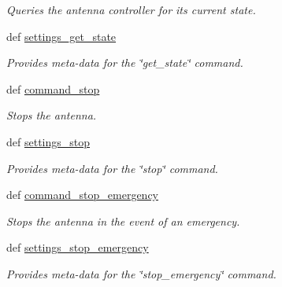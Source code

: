 \begin{DoxyCompactItemize}
\begin{DoxyCompactList}\small\item\em Queries the antenna controller for its current state. \end{DoxyCompactList}\item 
def \hyperlink{classhwm_1_1hardware_1_1devices_1_1drivers_1_1mxl__antenna__controller_1_1mxl__antenna__controll042461b90848f732dc4817f26065c532_ab60766f351f2ed9140504dd895757ec8}{settings\-\_\-get\-\_\-state}
\begin{DoxyCompactList}\small\item\em Provides meta-\/data for the \char`\"{}get\-\_\-state\char`\"{} command. \end{DoxyCompactList}\item 
def \hyperlink{classhwm_1_1hardware_1_1devices_1_1drivers_1_1mxl__antenna__controller_1_1mxl__antenna__controll042461b90848f732dc4817f26065c532_a90342f9f8d23a6b0f4232bbaa992a3a7}{command\-\_\-stop}
\begin{DoxyCompactList}\small\item\em Stops the antenna. \end{DoxyCompactList}\item 
def \hyperlink{classhwm_1_1hardware_1_1devices_1_1drivers_1_1mxl__antenna__controller_1_1mxl__antenna__controll042461b90848f732dc4817f26065c532_a2775869005a4a92e83c940838df995d1}{settings\-\_\-stop}
\begin{DoxyCompactList}\small\item\em Provides meta-\/data for the \char`\"{}stop\char`\"{} command. \end{DoxyCompactList}\item 
def \hyperlink{classhwm_1_1hardware_1_1devices_1_1drivers_1_1mxl__antenna__controller_1_1mxl__antenna__controll042461b90848f732dc4817f26065c532_aa1236d3a132e7651be07c48050d8e46d}{command\-\_\-stop\-\_\-emergency}
\begin{DoxyCompactList}\small\item\em Stops the antenna in the event of an emergency. \end{DoxyCompactList}\item 
def \hyperlink{classhwm_1_1hardware_1_1devices_1_1drivers_1_1mxl__antenna__controller_1_1mxl__antenna__controll042461b90848f732dc4817f26065c532_a4010fde9615f69c6fc5ce4630282da74}{settings\-\_\-stop\-\_\-emergency}
\begin{DoxyCompactList}\small\item\em Provides meta-\/data for the \char`\"{}stop\-\_\-emergency\char`\"{} command. \end{DoxyCompactList}\end{DoxyCompactItemize}
